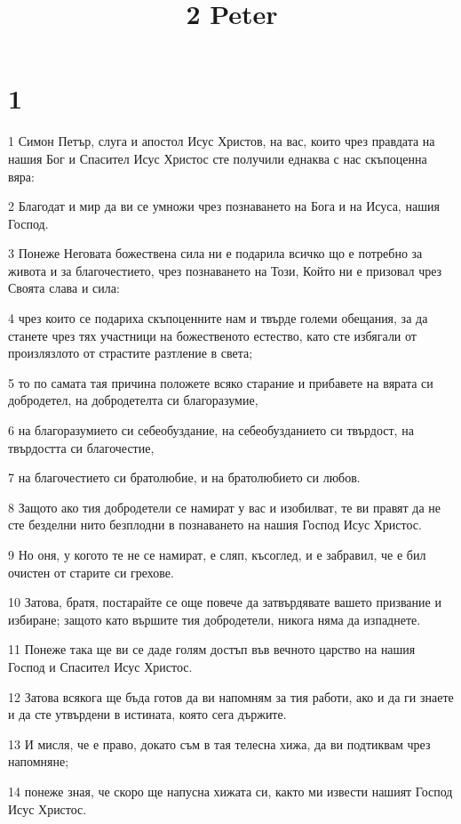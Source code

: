 

\title{2 Peter}


\chapter{1}

\par 1 Симон Петър, слуга и апостол Исус Христов, на вас, които чрез правдата на нашия Бог и Спасител Исус Христос сте получили еднаква с нас скъпоценна вяра:
\par 2 Благодат и мир да ви се умножи чрез познаването на Бога и на Исуса, нашия Господ.
\par 3 Понеже Неговата божествена сила ни е подарила всичко що е потребно за живота и за благочестието, чрез познаването на Този, Който ни е призовал чрез Своята слава и сила:
\par 4 чрез които се подариха скъпоценните нам и твърде големи обещания, за да станете чрез тях участници на божественото естество, като сте избягали от произлязлото от страстите разтление в света;
\par 5 то по самата тая причина положете всяко старание и прибавете на вярата си добродетел, на добродетелта си благоразумие,
\par 6 на благоразумието си себеобуздание, на себеобузданието си твърдост, на твърдостта си благочестие,
\par 7 на благочестието си братолюбие, и на братолюбието си любов.
\par 8 Защото ако тия добродетели се намират у вас и изобилват, те ви правят да не сте безделни нито безплодни в познаването на нашия Господ Исус Христос.
\par 9 Но оня, у когото те не се намират, е сляп, късоглед, и е забравил, че е бил очистен от старите си грехове.
\par 10 Затова, братя, постарайте се още повече да затвърдявате вашето призвание и избиране; защото като вършите тия добродетели, никога няма да изпаднете.
\par 11 Понеже така ще ви се даде голям достъп във вечното царство на нашия Господ и Спасител Исус Христос.
\par 12 Затова всякога ще бъда готов да ви напомням за тия работи, ако и да ги знаете и да сте утвърдени в истината, която сега държите.
\par 13 И мисля, че е право, докато съм в тая телесна хижа, да ви подтиквам чрез напомняне;
\par 14 понеже зная, че скоро ще напусна хижата си, както ми извести нашият Господ Исус Христос.
